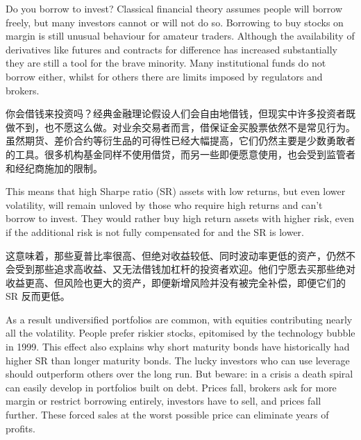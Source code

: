 
\begin{englishblock} Do you borrow to invest? Classical financial theory assumes people will borrow freely, but many investors cannot or will not do so. Borrowing to buy stocks on margin is still unusual behaviour for amateur traders. Although the availability of derivatives like futures and contracts for difference has increased substantially they are still a tool for the brave minority. Many institutional funds do not borrow either, whilst for others there are limits imposed by regulators and brokers. \end{englishblock}

\begin{chineseblock}你会借钱来投资吗？经典金融理论假设人们会自由地借钱，但现实中许多投资者既做不到，也不愿这么做。对业余交易者而言，借保证金买股票依然不是常见行为。虽然期货、差价合约等衍生品的可得性已经大幅提高，它们仍然主要是少数勇敢者的工具。很多机构基金同样不使用借贷，而另一些即便愿意使用，也会受到监管者和经纪商施加的限制。\end{chineseblock}

\bipairgap

\begin{englishblock} This means that high Sharpe ratio (SR) assets with low returns, but even lower volatility, will remain unloved by those who require high returns and can't borrow to invest. They would rather buy high return assets with higher risk, even if the additional risk is not fully compensated for and the SR is lower. \end{englishblock}

\begin{chineseblock}这意味着，那些夏普比率很高、但绝对收益较低、同时波动率更低的资产，仍然不会受到那些追求高收益、又无法借钱加杠杆的投资者欢迎。他们宁愿去买那些绝对收益更高、但风险也更大的资产，即便新增风险并没有被完全补偿，即便它们的 SR 反而更低。\end{chineseblock}

\bipairgap

\begin{englishblock} As a result undiversified portfolios are common, with equities contributing nearly all the volatility. People prefer riskier stocks, epitomised by the technology bubble in 1999. This effect also explains why short maturity bonds have historically had higher SR than longer maturity bonds. The lucky investors who can use leverage should outperform others over the long run. But beware: in a crisis a death spiral can easily develop in portfolios built on debt. Prices fall, brokers ask for more margin or restrict borrowing entirely, investors have to sell, and prices fall further. These forced sales at the worst possible price can eliminate years of profits. \end{englishblock}

